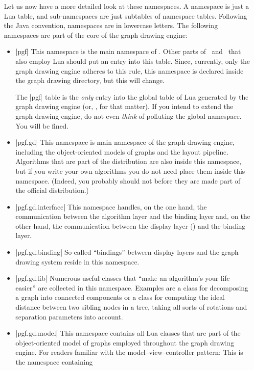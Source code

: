 Let us now have a more detailed look at these namespaces. A namespace
is just a Lua table, and sub-namespaces are just subtables of
namespace tables. Following the Java convention, namespaces are in
lowercase letters. The following namespaces are part of the core of
the graph drawing engine:
\begin{itemize}
\item |pgf| This namespace is the main namespace of \pgfname. Other
  parts of \pgfname\ and \tikzname\ that also employ Lua should put an
  entry into this table. Since, currently, only the graph drawing
  engine adheres to this rule, this namespace is declared inside the
  graph drawing directory, but this will change.

  The |pgf| table is the \emph{only} entry into the global table of
  Lua generated by the graph drawing engine (or, \pgfname, for that
  matter). If you intend to extend the graph drawing engine, do not
  even \emph{think} of polluting the global namespace. You will be
  fined.
\item |pgf.gd| This namespace is main namespace of the graph drawing
  engine, including the object-oriented models of graphs and the
  layout pipeline. Algorithms that are part of the
  distribution are also inside this namespace, but if you write your
  own algorithms you do not need place them inside this
  namespace. (Indeed, you probably should not before they are made
  part of the official distribution.)
\item |pgf.gd.interface| This namespace handles, on the one hand, the
  communication between the algorithm layer and the binding layer and,
  on the other hand, the communication between the display layer
  (\tikzname) and the binding layer.
\item |pgf.gd.binding| So-called ``bindings'' between display layers
  and the graph drawing system reside in this namespace.
\item |pgf.gd.lib| Numerous useful classes that ``make an algorithm's
  your life easier'' are collected in this namespace. Examples are a
  class for decomposing a graph into connected components or a class
  for computing the ideal distance between two sibling nodes in a
  tree, taking all sorts of rotations and separation parameters into
  account. 
\item |pgf.gd.model| This namespace contains all Lua classes that are
  part of the object-oriented model of graphs employed
  throughout the graph drawing engine. For readers familiar with the
  model--view--controller pattern: This is the namespace containing

\end{itemize}

